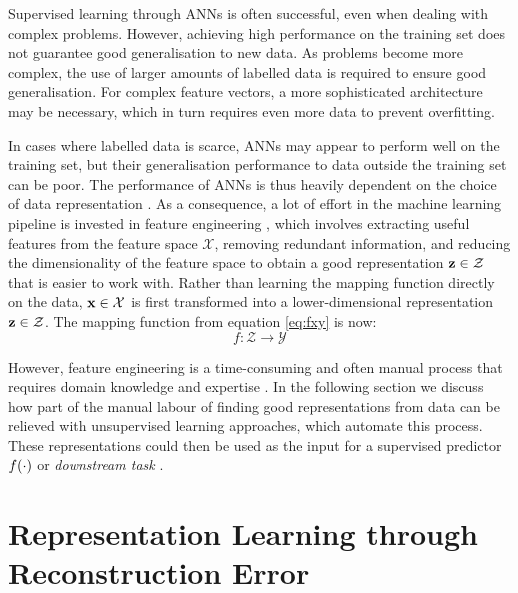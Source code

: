 	Supervised learning through ANNs is often successful, even when dealing with complex problems. However, achieving high performance on the training set does not guarantee good generalisation to new data. As problems become more complex, the use of larger amounts of labelled data is required to ensure good generalisation. For complex feature vectors, a more sophisticated architecture may be necessary, which in turn requires even more data to prevent overfitting. %
	
	In cases where labelled data is scarce, ANNs may appear to perform well on the training set, but their generalisation performance to data outside the training set can be poor. The performance of ANNs is thus heavily dependent on the choice of data representation \citep{bengioRepresentationLearningReview2013}. As a consequence, a lot of effort in the machine learning pipeline is invested in feature engineering \citep{zhengFeatureEngineeringMachine2018}, which involves extracting useful features from the feature space $\mathcal{X}$, removing redundant information, and reducing the dimensionality of the feature space \citep{valiDeepLearningLand2020} to obtain a good representation $\mathbf{z} \in \mathcal{Z}$ that is easier to work with. Rather than learning the mapping function directly on the data, $\mathbf{x} \in \mathcal{X}$ is first transformed into a lower-dimensional representation $\mathbf{z} \in \mathcal{Z}$. The mapping function from equation \ref{eq:fxy} is now:
	$$f: \mathcal{Z} \rightarrow \mathcal{Y} \label{eq:fxz} $$
	
	However, feature engineering is a time-consuming and often manual process that requires domain knowledge and expertise \citep{przybyszewskiUseDomainKnowledge2017, weiIntegrationDomainKnowledgeGuided2021}. In the following section we discuss how part of the manual labour of finding good representations from data can be relieved with unsupervised learning approaches, which automate this process. These representations could then be used as the input for a supervised predictor $f(\cdot)$ or \textit{downstream task} \citep{zhangOmiEmbedUnifiedMultiTask2021}.


\section{Representation Learning through Reconstruction Error} \label{cha:bg_reconstr}


